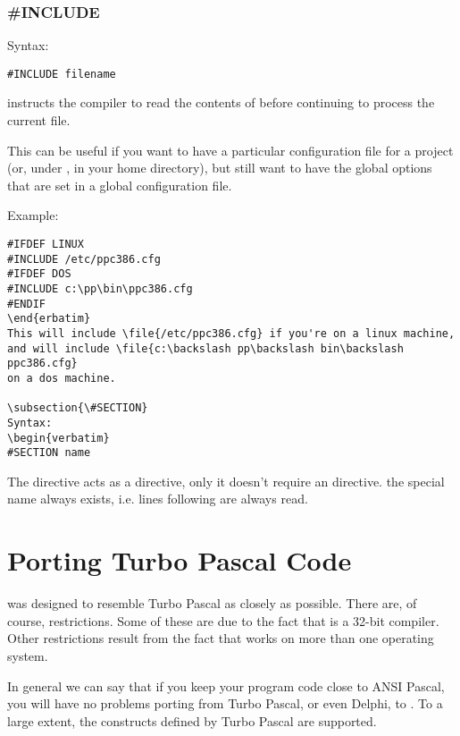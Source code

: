 \documentclass{report}
\begin{document}
\subsection{\#INCLUDE}
Syntax:
\begin{verbatim}
#INCLUDE filename
\end{verbatim}
 instructs the compiler to read the contents of
 before continuing to process the current file.

This can be useful if you want to have a particular configuration file
for a project (or, under \linux, in your home directory), but still want to
have the global options that are set in a global configuration file.

Example:
\begin{verbatim}
#IFDEF LINUX
#INCLUDE /etc/ppc386.cfg
#IFDEF DOS
#INCLUDE c:\pp\bin\ppc386.cfg
#ENDIF
\end{erbatim}
This will include \file{/etc/ppc386.cfg} if you're on a linux machine,
and will include \file{c:\backslash pp\backslash bin\backslash ppc386.cfg}
on a dos machine.

\subsection{\#SECTION}
Syntax:
\begin{verbatim}
#SECTION name
\end{verbatim}
The  directive acts as a  directive, only
it doesn't require an  directive. the special name 
always exists, i.e. lines following  are always read.


\chapter{Porting Turbo Pascal Code}

\fpc was designed to resemble Turbo Pascal as closely as possible. There
are, of course, restrictions. Some of these are due to the fact that \fpc is
a 32-bit compiler. Other restrictions result from the fact that \fpc works
on more than one operating system.

In general we can say that if you keep your program code close to ANSI
Pascal, you will have no problems porting from Turbo Pascal, or even Delphi, to
\fpc. To a large extent, the constructs defined by Turbo Pascal are
supported.
\end{document}
